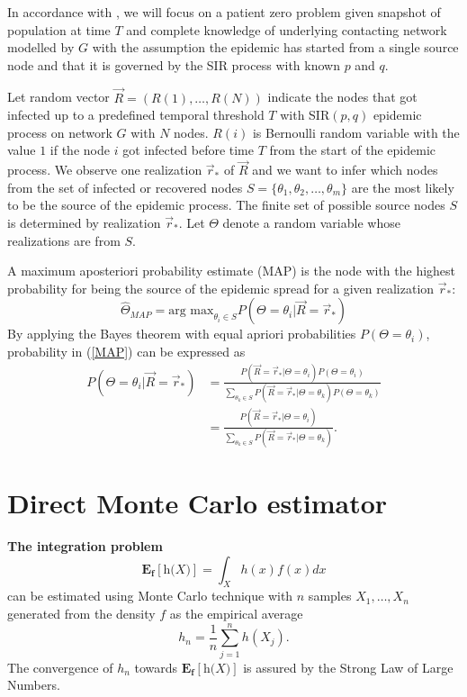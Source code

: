 \documentclass[times, utf8, diplomski]{fer}
\begin{document}
In accordance with \cite{Nino}, we will focus on a patient zero problem given snapshot of population at time $T$ and complete knowledge of underlying contacting network modelled by $G$ with the assumption the epidemic has started from a single source node and that it is governed by the SIR process with known $p$ and $q$. 

Let random vector $\vec R = (R(1), \ldots, R(N))$ indicate the nodes that got infected up to a predefined temporal threshold $T$ with SIR$(p, q)$ epidemic process on network $G$ with $N$ nodes. $R(i)$ is Bernoulli random variable with the value $1$ if the node $i$ got infected before time $T$ from the start of the epidemic process. We observe one realization $\vec r_*$ of $\vec R$ and we want to infer which nodes from the set of infected or recovered nodes $S = \{\theta_1, \theta_2, \ldots, \theta_m \}$ are the most likely to be the source of the epidemic process.  The finite set of possible source nodes $S$ is determined by realization $\vec r_*$. Let $\Theta$ denote a random variable whose realizations are from $S$.

A maximum aposteriori probability estimate (MAP) is the node with the highest probability for being the source of the epidemic spread for a given realization $\vec r_*$: 
\begin{equation}
\hat{\Theta}_{MAP} = \text{arg max}_{\theta_i \in S} P(\Theta = \theta_i | \vec{R} = \vec r_*)
\label{MAP}
\end{equation}
By applying the Bayes theorem with equal apriori probabilities $P(\Theta = \theta_i)$, probability in (\ref{MAP}) can be expressed as 
\begin{equation}
\begin{aligned}
P(\Theta = \theta_i | \vec{R} = \vec r_*) &= \frac{P(\vec R = \vec r_* | \Theta = \theta_i) P(\Theta = \theta_i)}{\sum_{\theta_k \in S} P(\vec R = \vec r_* | \Theta = \theta_k) P(\Theta = \theta_k)} \\ &= \frac{P(\vec R = \vec r_* | \Theta = \theta_i)}{\sum_{\theta_k \in S} P(\vec R = \vec r_* | \Theta = \theta_k)}.
\end{aligned}
\label{MAP_pravi}
\end{equation}

\section{Direct Monte Carlo estimator}

\textbf{The integration problem}
\begin{equation}
\mathbf{E_f[\textit{h(X)}]} = \int_{X} h(x) f(x) dx
\label{exp}
\end{equation} can be estimated using Monte Carlo technique with $n$ samples $X_1, \ldots, X_n$ generated from the density $f$ as the empirical average 
\begin{equation}
h_n = \frac{1}{n} \sum_{j = 1}^{n} h(X_j).
\end{equation}
The convergence of $h_n$ towards $\mathbf{E_f[\textit{h(X)}]}$ is assured by the Strong Law of Large Numbers.
\end{document}
